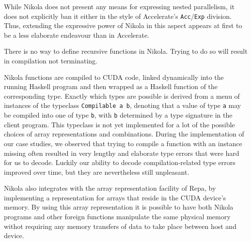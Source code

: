 While Nikola does not present any means for expressing nested parallelism, it
does not explicitly ban it either in the style of Accelerate's
\texttt{Acc}/\texttt{Exp} division. Thus, extending the expressive power of
Nikola in this aspect appears at first to be a less elaborate endeavour than in
Accelerate.

There is no way to define recursive functions in Nikola. Trying to do so
will result in compilation not terminating.

Nikola functions are compiled to CUDA code, linked dynamically into
the running Haskell program and then wrapped as a Haskell function of
the corresponding type.  Exactly which types are possible is derived
from a menu of instances of the typeclass \texttt{Compilable a b},
denoting that a value of type \texttt{a} may be compiled into one of
type \texttt{b}, with \texttt{b} determined by a type signature in the
client program. This typeclass is not yet implemented for a lot of the
possible choices of array representations and combinations. During the
implementation of our case studies, we observed that trying to compile
a function with an instance missing often resulted in very lengthy and
elaborate type errors that were hard for us to decode. Luckily our
ability to decode compilation-related type errors improved over time,
but they are nevertheless still unpleasant.

Nikola also integrates with the array representation facility of Repa, by
implementing a representation for arrays that reside in the CUDA device's
memory. By using this array representation it is possible to have both Nikola
programs and other foreign functions manipulate the same physical memory withot
requiring any memory transfers of data to take place between host and device.


